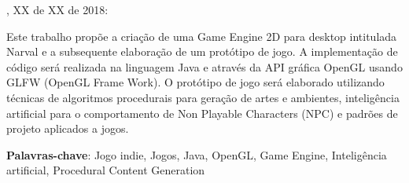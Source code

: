 \documentclass[12pt, 
openright, 
oneside, 
a4paper,    
brazil]{facom-ufu-abntex2}
\begin{document}

\pagestyle{plain}



\imprimircapa

\begin{folhadeaprovacao}

  \begin{center}
    {\ABNTEXchapterfont\large\imprimirautor}

    \vspace*{\fill}\vspace*{\fill}
    {\ABNTEXchapterfont\bfseries\Large\imprimirtitulo}
    \vspace*{\fill}
    
    \hspace{.45\textwidth}
    \begin{minipage}{.5\textwidth}
    \imprimirpreambulo
    \end{minipage}%
    \vspace*{\fill}
   \end{center}
    
   \imprimirlocal, XX de XX de 2018: %

      
   \begin{center}
    \vspace*{0.5cm}
    {\large\imprimirlocal}
    \par
    {\large\imprimirdata}
    \vspace*{1cm}
  \end{center}
  
\end{folhadeaprovacao}
\begin{resumo} 

Este trabalho propõe a criação de uma Game Engine 2D para desktop intitulada Narval e a subsequente elaboração de um protótipo de jogo.
A implementação de código será realizada na linguagem Java e através da API gráfica OpenGL usando GLFW (OpenGL Frame Work). 
O protótipo de jogo será elaborado utilizando técnicas de algoritmos procedurais para geração de artes e ambientes, inteligência artificial para o comportamento de Non Playable Characters (NPC) e padrões de projeto aplicados a jogos.
 
 \vspace{\onelineskip}
 \noindent
 \textbf{Palavras-chave}: Jogo indie, Jogos, Java, OpenGL, Game Engine, Inteligência artificial, Procedural Content Generation
\end{resumo}
\end{document}

